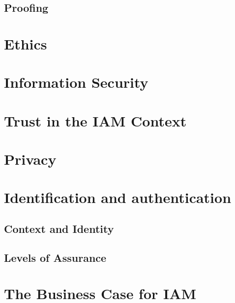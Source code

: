 \hypertarget{proofing}{%
\subsection{Proofing}\label{proofing}}

\hypertarget{ethics}{%
\section{Ethics}\label{ethics}}

\hypertarget{information-security}{%
\section{Information Security}\label{information-security}}

\hypertarget{trust-in-the-iam-context}{%
\section{Trust in the IAM Context}\label{trust-in-the-iam-context}}

\hypertarget{privacy}{%
\section{Privacy}\label{privacy}}

\hypertarget{identification-and-authentication}{%
\section{Identification and
authentication}\label{identification-and-authentication}}

\hypertarget{context-and-identity}{%
\subsection{Context and Identity}\label{context-and-identity}}

\hypertarget{levels-of-assurance}{%
\subsection{Levels of Assurance}\label{levels-of-assurance}}

\hypertarget{the-business-case-for-iam}{%
\section{The Business Case for IAM}\label{the-business-case-for-iam}}

